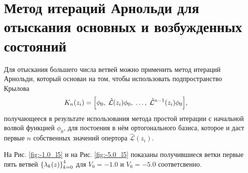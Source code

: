 \documentclass[10pt]{article}
\begin{document}
\section{Метод итераций Арнольди для отыскания основных и возбужденных состояний}

Для отыскания большего числа ветвей можно применить метод итераций Арнольди, который основан на том, чтобы использовать подпространство Крылова
$$
K_n(z_i) = \qty[\phi_0,\; \hat{\mathcal{L}}(z_i)\phi_0,\; \ldots,\; \hat{\mathcal{L}}^{n-1}(z_i)\phi_0],
$$
получающееся в результате использования метода простой итерации с начальной волвой функцией $\phi_0$, для постоения в нём ортогонального базиса, которое и даст первые $n$ собственных значений опертора $\hat{\mathcal{L}}(z_i)$.

На Рис. \ref{fig:-1.0_l5} и на Рис. \ref{fig:-5.0_l5} показаны получившиеся ветки первые пять ветвей $\qty{\lambda_k(z)}_{k=0}^4$ для $V_0 = -1.0$ и $V_0=-5.0$ соответсвенно.
\end{document}
